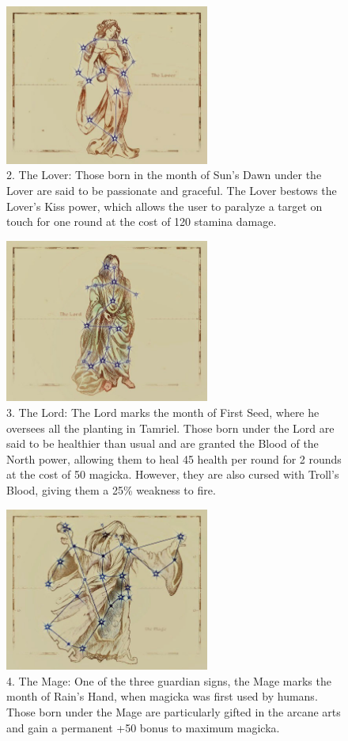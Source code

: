 \documentclass[12pt]{book}
\begin{document}
\begin{figure}[H]
\includegraphics[width=0.6\textwidth]{Lover.png}
\centering
\caption*{2. The Lover: Those born in the month of Sun's Dawn under the Lover are said to be passionate and graceful. The Lover bestows the Lover's Kiss power, which allows the user to paralyze a target on touch for one round at the cost of 120 stamina damage.}
\end{figure}

\begin{figure}[H]
\includegraphics[width=0.6\textwidth]{Lord.png}
\centering
\caption*{3. The Lord: The Lord marks the month of First Seed, where he oversees all the planting in Tamriel. Those born under the Lord are said to be healthier than usual and are granted the Blood of the North power, allowing them to heal 45 health per round for 2 rounds at the cost of 50 magicka. However, they are also cursed with Troll's Blood, giving them a 25\% weakness to fire.}
\end{figure}

\begin{figure}[H]
\includegraphics[width=0.6\textwidth]{Mage.png}
\centering
\caption*{4. The Mage: One of the three guardian signs, the Mage marks the month of Rain's Hand, when magicka was first used by humans. Those born under the Mage are particularly gifted in the arcane arts and gain a permanent +50 bonus to maximum magicka.}
\end{figure}
\end{document}
